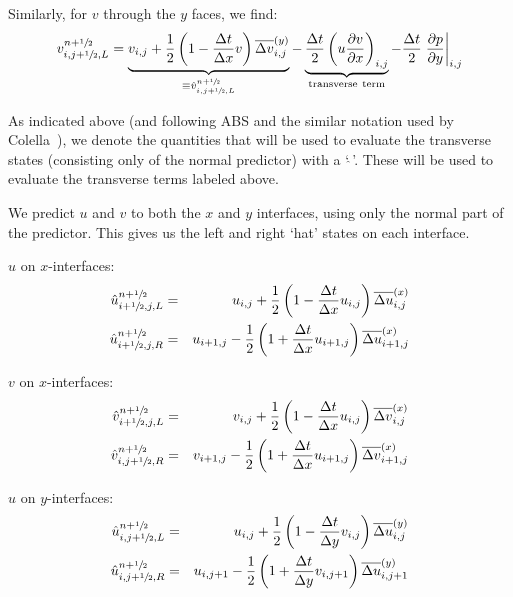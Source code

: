 Similarly, for $v$ through the $y$ faces, we find:
\begin{equation}
v_{i,j+{\sfrac{1}{2}},L}^{n+{\sfrac{1}{2}}} 
    = \underbrace{v_{i,j} + \frac{1}{2} \left ( 1 - \frac{\Delta t}{\Delta x} v \right ) \overline{\Delta v}^{(y)}_{i,j}}_{\equiv \hat{v}_{i,j+{\sfrac{1}{2}},L}^{n+{\sfrac{1}{2}}}}
    - \underbrace{\frac{\Delta t}{2} \left ( u \frac{\partial v}{\partial x} \right )_{i,j}}_{\mathrm{transverse~term}}
    - \frac{\Delta t}{2} \left . \frac{\partial p}{\partial y} \right |_{i,j}
\label{eq:vMAC_l}
\end{equation} 

As indicated above (and following ABS and the similar notation used by
Colella~\cite{colella:1990}), we denote the quantities that will be used to evaluate
the transverse states (consisting only of the normal predictor) with a
`$\hat{~}$'.  These will be used to evaluate the transverse terms
labeled above.

We predict $u$ and $v$ to both the $x$ and $y$ interfaces, using only
the normal part of the predictor.  This gives us the left and right `hat'
states on each interface.

\noindent $u$ on $x$-interfaces:
\begin{eqnarray}
\hat{u}_{i+\myhalf,j,L}^{n+\myhalf} &=&
   u_{i,j} + \frac{1}{2} \left ( 1 - \frac{\Delta t}{\Delta x} u_{i,j} \right )
       \Dux_{i,j} \\ 
%
\hat{u}_{i+\myhalf,j,R}^{n+\myhalf} &=&
   u_{i+1,j} - \frac{1}{2} \left ( 1 + \frac{\Delta t}{\Delta x} u_{i+1,j} \right )
       \Dux_{i+1,j} 
\end{eqnarray}

\noindent $v$ on $x$-interfaces:
\begin{eqnarray}
\hat{v}_{i+\myhalf,j,L}^{n+\myhalf} &=&
   v_{i,j} + \frac{1}{2} \left ( 1 - \frac{\Delta t}{\Delta x} u_{i,j} \right )
       \Dvx_{i,j} \\ 
%
\hat{v}_{i,j+\myhalf,R}^{n+\myhalf} &=&
   v_{i+1,j} - \frac{1}{2} \left ( 1 + \frac{\Delta t}{\Delta x} u_{i+1,j} \right )
       \Dvx_{i+1,j} 
\end{eqnarray}

\noindent $u$ on $y$-interfaces:
\begin{eqnarray}
\hat{u}_{i,j+\myhalf,L}^{n+\myhalf} &=&
   u_{i,j} + \frac{1}{2} \left ( 1 - \frac{\Delta t}{\Delta y} v_{i,j} \right )
       \Duy_{i,j} \\ 
%
\hat{u}_{i,j+\myhalf,R}^{n+\myhalf} &=&
   u_{i,j+1} - \frac{1}{2} \left ( 1 + \frac{\Delta t}{\Delta y} v_{i,j+1} \right )
       \Duy_{i,j+1} 
\end{eqnarray}

